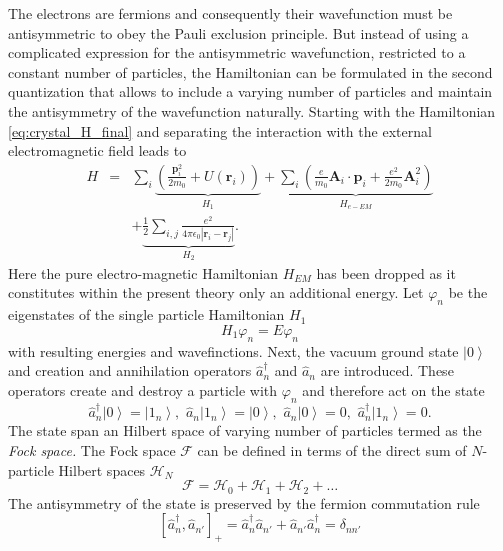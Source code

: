 The electrons are fermions and consequently their wavefunction must
be antisymmetric to obey the Pauli exclusion principle. But instead
of using a complicated expression for the antisymmetric wavefunction,
restricted to a constant number of particles, the Hamiltonian can
be formulated in the second quantization that allows to include a
varying number of particles and maintain the antisymmetry of the wavefunction
naturally. Starting with the Hamiltonian \ref{eq:crystal_H_final}
and separating the interaction with the external electromagnetic field
leads to\ \begin{eqnarray}
H & = & \sum_{i}\underbrace{\left(\frac{\mathbf{p}_{i}^{2}}{2m_{0}}+U(\mathbf{r}_{i})\right)}_{H_{1}}+\underbrace{\sum_{i}\left(\frac{e}{m_{0}}\mathbf{A}_{i}\cdot\mathbf{p}_{i}+\frac{e^{2}}{2m_{0}}\mathbf{A}_{i}^{2}\right)}_{H_{e-EM}}\nonumber \\
 &  & +\underbrace{\frac{1}{2}\sum_{i,j}\frac{e^{2}}{4\pi\epsilon_{0}\left|\mathbf{r}_{i}-\mathbf{r}_{j}\right|}}_{H_{2}}.\label{eq:Separated_Hamiltonian-1}\end{eqnarray}
Here the pure electro-magnetic Hamiltonian $H_{EM}$ has been dropped
as it constitutes within the present theory only an additional energy.
Let $\varphi_{n}$ be the eigenstates of the single particle Hamiltonian
$H_{1}$\begin{equation}
H_{1}\varphi_{n}=E\varphi_{n}\end{equation}
with resulting energies and wavefinctions. Next, the vacuum ground
state $\left|0\right\rangle $ and creation and annihilation operators
$\hat{a}_{n}^{\dagger}$ and $\hat{a}_{n}$ are introduced. These
operators create and destroy a particle with $\varphi_{n}$ and therefore
act on the state\begin{equation}
\hat{a}_{n}^{\dagger}\left|0\right\rangle =\left|1_{n}\right\rangle ,\,\,\hat{a}_{n}\left|1_{n}\right\rangle =\left|0\right\rangle ,\,\,\hat{a}_{n}\left|0\right\rangle =0,\,\,\hat{a}_{n}^{\dagger}\left|1_{n}\right\rangle =0.\end{equation}
The state span an Hilbert space of varying number of particles termed
as the \emph{Fock space. }The Fock space $\mathcal{F}$ can be defined
in terms of the direct sum of $N$-particle Hilbert spaces $\mathcal{H}_{N}$\[
\mathcal{F}=\mathcal{H}_{0}+\mathcal{H}_{1}+\mathcal{H}_{2}+\ldots\]
The antisymmetry of the state is preserved by the fermion commutation
rule\begin{equation}
\left[\hat{a}_{n}^{\dagger},\hat{a}_{n'}\right]_{+}=\hat{a}_{n}^{\dagger}\hat{a}_{n'}+\hat{a}_{n'}\hat{a}_{n}^{\dagger}=\delta_{nn'}\label{eq:commutation_rel_1}\end{equation}
